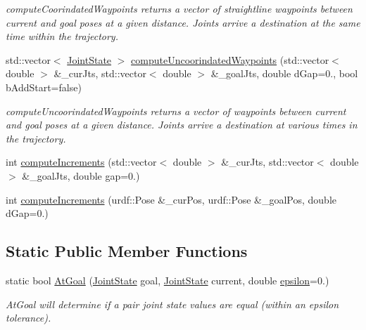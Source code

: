 \begin{DoxyCompactItemize}
\begin{DoxyCompactList}\small\item\em compute\-Coorindated\-Waypoints returns a vector of straightline waypoints between current and goal poses at a given distance. Joints arrive a destination at the same time within the trajectory. \end{DoxyCompactList}\item 
std\-::vector$<$ \hyperlink{RCS_8h_aa4adb93a26caa4dacba9c9614e283245}{Joint\-State} $>$ \hyperlink{classMotionControl_a5a7f01d81030676aab106b7bf4c60aa6}{compute\-Uncoorindated\-Waypoints} (std\-::vector$<$ double $>$ \&\-\_\-cur\-Jts, std\-::vector$<$ double $>$ \&\-\_\-goal\-Jts, double d\-Gap=0., bool b\-Add\-Start=false)
\begin{DoxyCompactList}\small\item\em compute\-Uncoorindated\-Waypoints returns a vector of waypoints between current and goal poses at a given distance. Joints arrive a destination at various times in the trajectory. \end{DoxyCompactList}\item 
int \hyperlink{classMotionControl_ac065f800e86df7a771aae2aa4271aaa3}{compute\-Increments} (std\-::vector$<$ double $>$ \&\-\_\-cur\-Jts, std\-::vector$<$ double $>$ \&\-\_\-goal\-Jts, double gap=0.)
\item 
int \hyperlink{classMotionControl_ad484a4d0524c9c4aa57c1762768aec05}{compute\-Increments} (urdf\-::\-Pose \&\-\_\-cur\-Pos, urdf\-::\-Pose \&\-\_\-goal\-Pos, double d\-Gap=0.)
\end{DoxyCompactItemize}
\subsection*{Static Public Member Functions}
\begin{DoxyCompactItemize}
\item 
static bool \hyperlink{classMotionControl_a57fb4b492bc50f10b4fd5e068bda4f7a}{At\-Goal} (\hyperlink{RCS_8h_aa4adb93a26caa4dacba9c9614e283245}{Joint\-State} goal, \hyperlink{RCS_8h_aa4adb93a26caa4dacba9c9614e283245}{Joint\-State} current, double \hyperlink{classMotionControl_ad3cadb7d245794540e4a320ee560b6b2}{epsilon}=0.)
\begin{DoxyCompactList}\small\item\em At\-Goal will determine if a pair joint state values are equal (within an epsilon tolerance). \end{DoxyCompactList}\end{DoxyCompactItemize}
